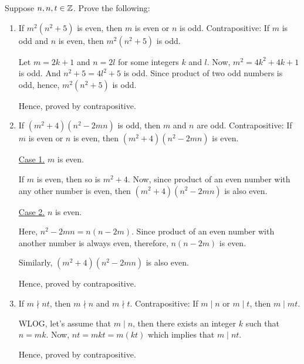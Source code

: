 \bp Suppose $n, n, t \in \mathbb{Z}$. Prove the following:
\begin{enumerate}
	\item If $m^2(n^2+5)$ is even, then $m$ is even or $n$ is odd.
		\bs
		Contrapositive: If $m$ is odd and $n$ is even, then $m^2(n^2+5)$ is odd.

		Let $m = 2k+1$ and $n = 2l$ for some integers $k$ and $l$.
		Now, $m^2 = 4k^2 + 4k + 1$ is odd. And $n^2 + 5 = 4l^2 + 5$ is odd. 
		Since product of two odd numbers is odd, hence, $m^2(n^2+5)$ is odd.

		Hence, proved by contrapositive.
		\es

	\item If $(m^2 + 4)(n^2 - 2mn)$ is odd, then $m$ and $n$ are odd.
		\bs
		Contrapositive: If $m$ is even or $n$ is even, then $(m^2 + 4)(n^2 - 2mn)$ is even.

		\underline{Case 1.} $m$ is even.

		If $m$ is even, then so is $m^2 + 4$. Now, since product of an even number with any other number is even, then $(m^2 + 4)(n^2 - 2mn)$ is also even.

		\underline{Case 2.} $n$ is even.

		Here, $n^2 - 2mn = n(n-2m)$. Since product of an even number with another number is always even, therefore, $n(n-2m)$ is even.

		Similarly, $(m^2+4)(n^2-2mn)$ is also even.

		Hence, proved by contrapositive.
		\es

	\item If $m \nmid nt$, then $m \nmid n$ and $m \nmid t$.
		\bs
		Contrapositive: If $m \mid n$ or $m \mid t$, then $m \mid mt$.

		WLOG, let's assume that $m \mid n$, then there exists an integer $k$ such that $n = mk$. Now, $nt = mkt = m(kt)$ which implies that $m \mid nt$.

		Hence, proved by contrapositive.
		\es
\end{enumerate}
\ep


